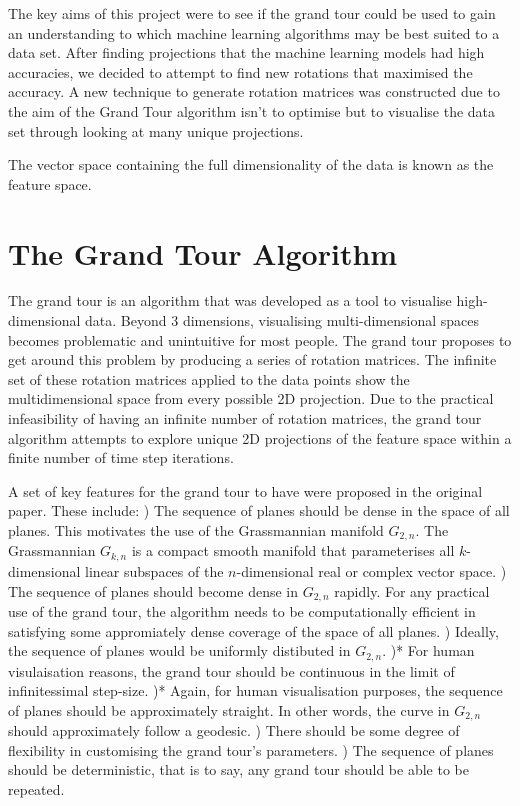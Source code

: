 \documentclass[a4paper,11pt,twoside]{article}
\begin{document}
The key aims of this project were to see if the grand tour could be used to gain an understanding to which machine learning algorithms may be best suited to a data set. After finding projections that the machine learning models had high accuracies, we decided to attempt to find new rotations that maximised the accuracy. A new technique to generate rotation matrices was constructed due to the aim of the Grand Tour algorithm isn’t to optimise but to visualise the data set through looking at many unique projections.
\newline

The vector space containing the full dimensionality of the data is known as the feature space.

\newpage
\section{The Grand Tour Algorithm}

The grand tour is an algorithm that was developed as a tool to visualise high-dimensional data. Beyond 3 dimensions, visualising multi-dimensional spaces becomes problematic and unintuitive for most people. The grand tour proposes to get around this problem by producing a series of rotation matrices. The infinite set of these rotation matrices applied to the data points show the multidimensional space from every possible 2D projection. Due to the practical infeasibility of having an infinite number of rotation matrices, the grand tour algorithm attempts to explore unique 2D projections of the feature space within a finite number of time step iterations. 
\newline

A set of key features for the grand tour to have were proposed in the original paper. These include:
) The sequence of planes should be dense in the space of all planes. This motivates the use of the Grassmannian manifold $G_{2,n}$. The Grassmannian $G_{k,n}$ is a compact smooth manifold that parameterises all $k$-dimensional linear subspaces of the $n$-dimensional real or complex vector space.
) The sequence of planes should become dense in $G_{2,n}$ rapidly. For any practical use of the grand tour, the algorithm needs to be computationally efficient in satisfying some appromiately dense coverage of the space of all planes.
) Ideally, the sequence of planes would be uniformly distibuted in $G_{2,n}$.
)* For human visulaisation reasons, the grand tour should be continuous in the limit of infinitessimal step-size.
)* Again, for human visualisation purposes, the sequence of planes should be approximately straight. In other words, the curve in $G_{2,n}$ should approximately follow a geodesic.
) There should be some degree of flexibility in customising the grand tour's parameters.
) The sequence of planes should be deterministic, that is to say, any grand tour should be able to be repeated.
\newline
\end{document}
